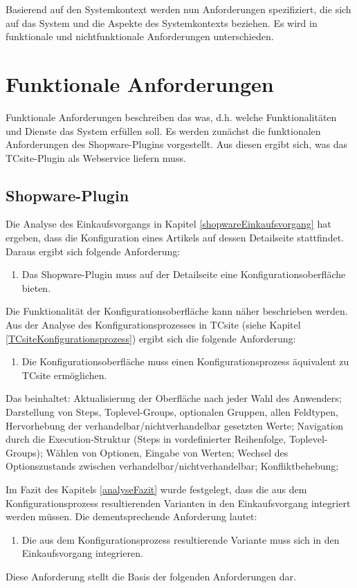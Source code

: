 \documentclass[11pt, a4paper, titlepage, listof=totoc, bibliography=totoc, index=totoc, twoside, openright, headings=normal]{scrreprt}
\begin{document}
Basierend auf den Systemkontext werden nun Anforderungen spezifiziert, die sich auf das System und die Aspekte des Systemkontexts beziehen. Es wird in funktionale und nichtfunktionale Anforderungen unterschieden.

\section{Funktionale Anforderungen}

Funktionale Anforderungen beschreiben das \glqq was\grqq{}, d.h. welche Funktionalitäten und Dienste das System erfüllen soll. Es werden zunächst die funktionalen Anforderungen des Shopware-Plugins vorgestellt. Aus diesen ergibt sich, was das TCsite-Plugin als Webservice liefern muss.

\subsection{Shopware-Plugin}
Die Analyse des Einkaufsvorgangs in Kapitel \ref{shopwareEinkaufsvorgang} hat ergeben, dass die Konfiguration eines Artikels auf dessen Detailseite stattfindet. Daraus ergibt sich folgende Anforderung:
\begin{enumerate}[SW.F01:]\bfseries
\item Das Shopware-Plugin muss auf der Detailseite eine Konfigurationsoberfläche bieten.
\end{enumerate}
Die Funktionalität der Konfigurationsoberfläche kann näher beschrieben werden. Aus der Analyse des Konfigurationsprozesses in TCsite (siehe Kapitel \ref{TCsiteKonfigurationsprozess}) ergibt sich die folgende Anforderung:
\begin{enumerate}[SW.F02:]\bfseries
\item Die Konfigurationsoberfläche muss einen Konfigurationsprozess äquivalent zu TCsite ermöglichen. 
\end{enumerate}
Das beinhaltet: Aktualisierung der Oberfläche nach jeder Wahl des Anwenders; Darstellung von Steps, Toplevel-Groups, optionalen Gruppen, allen Feldtypen, Hervorhebung der verhandelbar/nichtverhandelbar gesetzten Werte; Navigation durch die Execution-Struktur (Steps in vordefinierter Reihenfolge, Toplevel-Groups); Wählen von Optionen, Eingabe von Werten; Wechsel des Optionszustands zwischen verhandelbar/nichtverhandelbar; Konfliktbehebung;

Im Fazit des Kapitels \ref{analyseFazit} wurde festgelegt, dass die aus dem Konfigurationsprozess resultierenden Varianten in den Einkaufsvorgang integriert werden müssen. Die dementsprechende Anforderung lautet:
\begin{enumerate}[SW.F03:]\bfseries
\item Die aus dem Konfigurationsprozess resultierende Variante muss sich in den Einkaufsvorgang integrieren.
\end{enumerate}
Diese Anforderung stellt die Basis der folgenden Anforderungen dar.
\end{document}
